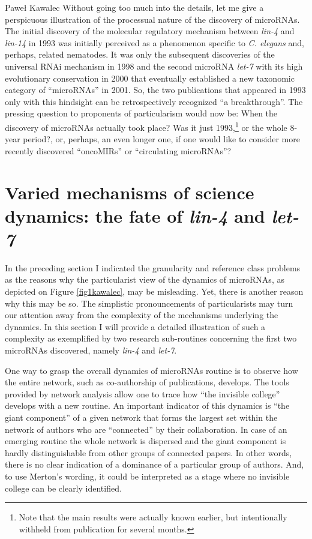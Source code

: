 \begin{artengenv}{Paweł Kawalec}
Without going too much into the details, let me give a perspicuous illustration of the processual nature of the discovery of microRNAs. The initial discovery of the molecular regulatory mechanism between \textit{lin-4} and \textit{lin-14} in 1993 was initially perceived as a phenomenon specific to \textit{C. elegans} and, perhaps, related nematodes. It was only the subsequent discoveries of the universal RNAi mechanism in 1998 and the second microRNA \textit{let-7} with its high evolutionary conservation in 2000 that eventually established a new taxonomic category of ``microRNAs'' in 2001. So, the two publications that appeared in 1993 only with this hindsight can be retrospectively recognized ``a breakthrough''. The pressing question to proponents of particularism would now be: When the discovery of microRNAs actually took place? Was it just 1993,\footnote{Note that the main results were actually known earlier, but intentionally withheld from publication for several months.} or the whole 8-year period?, or, perhaps, an even longer one, if one would like to consider more recently discovered ``oncoMIRs'' or ``circulating microRNAs''?

\section{Varied mechanisms of science dynamics: the fate of \textit{lin-4} and \textit{let-7}}
In the preceding section I indicated the granularity and reference class problems as the reasons why the particularist view of the dynamics of microRNAs, as depicted on Figure \ref{fig1kawalec}, may be misleading. Yet, there is another reason why this may be so. The simplistic pronouncements of particularists may turn our attention away from the complexity of the mechanisms underlying the dynamics. In this section I will provide a detailed illustration of such a complexity as exemplified by two research sub-routines concerning the first two microRNAs discovered, namely \textit{lin-4} and \textit{let-7}.

One way to grasp the overall dynamics of microRNAs routine is to observe how the entire network, such as co-authorship of publications, develops. The tools provided by network analysis allow one to trace how ``the invisible college''
\parencite[][pp.viii–ix]{merton_foreword_1986} %
 develops with a new routine. An important indicator of this dynamics is ``the giant component'' of a given network that forms the largest set within the network of authors who are ``connected'' by their collaboration. In case of an emerging routine the whole network is dispersed and the giant component is hardly distinguishable from other groups of connected papers. In other words, there is no clear indication of a dominance of a particular group of authors. And, to use Merton's wording, it could be interpreted as a stage where no invisible college can be clearly identified.


\end{artengenv}
